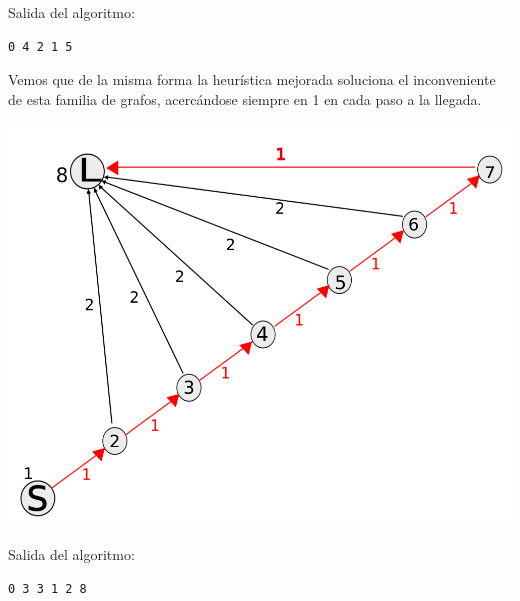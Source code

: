\vspace{5mm}
Salida del algoritmo:

\begin{lstlisting}[frame=single]
0 4 2 1 5
\end{lstlisting}

Vemos que de la misma forma la heur\'istica mejorada soluciona el inconveniente de esta familia de grafos, acerc\'andose siempre en 1 en cada paso a la llegada.

\begin{center}
\includegraphics[scale=0.3]{img/grafoChotoNumerado.png}
\end{center}

\vspace{10mm}

Salida del algoritmo:

\begin{lstlisting}[frame=single]
0 3 3 1 2 8
\end{lstlisting}